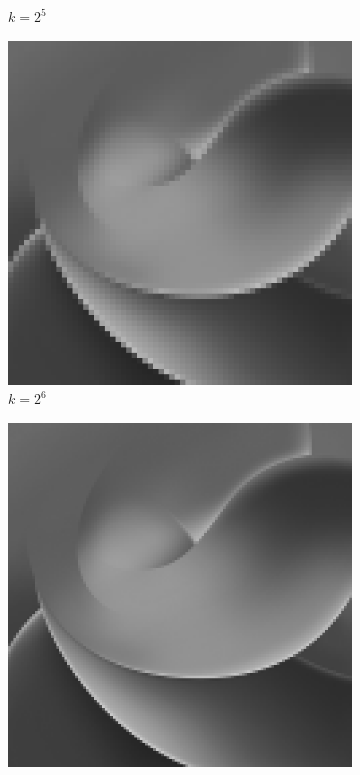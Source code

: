 \begin{figure}[H]
\begin{subfigure}[b]{0.3\textwidth}
        \caption{$k = 2^5$}
    \end{subfigure}
    \begin{subfigure}[b]{0.3\textwidth}
        \centering
        \includegraphics[width=\textwidth]{problem2/low_freq_64.bmp}
        \caption{$k = 2^6$}
    \end{subfigure}
    \hfill
    \begin{subfigure}[b]{0.3\textwidth}
        \centering
        \includegraphics[width=\textwidth]{problem2/low_freq_128.bmp}

\end{subfigure}
\end{figure}

